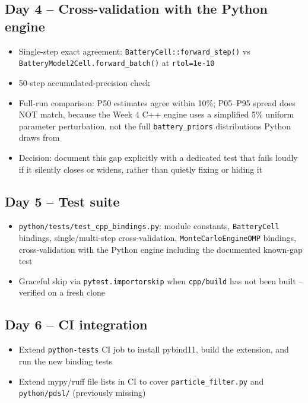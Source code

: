 \documentclass[11pt]{article}
\begin{document}
\subsection*{Day 4 -- Cross-validation with the Python engine}
\begin{itemize}[leftmargin=*]
  \item Single-step exact agreement: \texttt{BatteryCell::forward\_step()}
    vs \texttt{BatteryModel2Cell.forward\_batch()} at \texttt{rtol=1e-10}
  \item 50-step accumulated-precision check
  \item Full-run comparison: P50 estimates agree within 10\%; P05--P95
    spread does NOT match, because the Week 4 C++ engine uses a
    simplified 5\% uniform parameter perturbation, not the full
    \texttt{battery\_priors} distributions Python draws from
  \item Decision: document this gap explicitly with a dedicated test
    that fails loudly if it silently closes or widens, rather than
    quietly fixing or hiding it
\end{itemize}

\subsection*{Day 5 -- Test suite}
\begin{itemize}[leftmargin=*]
  \item \texttt{python/tests/test\_cpp\_bindings.py}: module constants,
    \texttt{BatteryCell} bindings, single/multi-step cross-validation,
    \texttt{MonteCarloEngineOMP} bindings, cross-validation with the
    Python engine including the documented known-gap test
  \item Graceful skip via \texttt{pytest.importorskip} when
    \texttt{cpp/build} has not been built -- verified on a fresh clone
\end{itemize}

\subsection*{Day 6 -- CI integration}
\begin{itemize}[leftmargin=*]
  \item Extend \texttt{python-tests} CI job to install pybind11, build
    the extension, and run the new binding tests
  \item Extend mypy/ruff file lists in CI to cover
    \texttt{particle\_filter.py} and \texttt{python/pdsl/} (previously
    missing)
\end{itemize}
\end{document}
